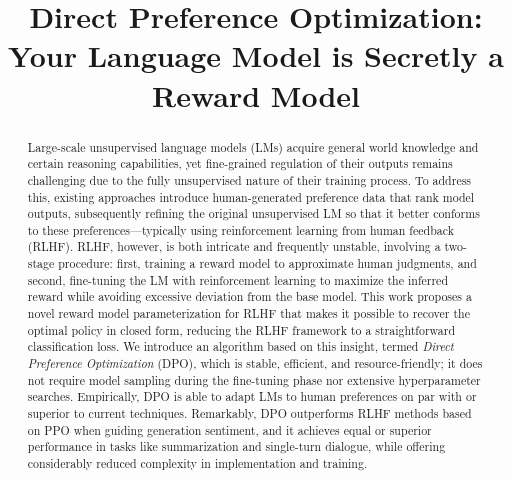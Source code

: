 \title{Direct Preference Optimization: Your Language Model is Secretly a Reward Model}

\begin{abstract}
Large-scale unsupervised language models (LMs) acquire general world knowledge and certain reasoning capabilities, yet fine-grained regulation of their outputs remains challenging due to the fully unsupervised nature of their training process. To address this, existing approaches introduce human-generated preference data that rank model outputs, subsequently refining the original unsupervised LM so that it better conforms to these preferences—typically using reinforcement learning from human feedback (RLHF). RLHF, however, is both intricate and frequently unstable, involving a two-stage procedure: first, training a reward model to approximate human judgments, and second, fine-tuning the LM with reinforcement learning to maximize the inferred reward while avoiding excessive deviation from the base model. This work proposes a novel reward model parameterization for RLHF that makes it possible to recover the optimal policy in closed form, reducing the RLHF framework to a straightforward classification loss. We introduce an algorithm based on this insight, termed \textit{Direct Preference Optimization} (DPO), which is stable, efficient, and resource-friendly; it does not require model sampling during the fine-tuning phase nor extensive hyperparameter searches. Empirically, DPO is able to adapt LMs to human preferences on par with or superior to current techniques. Remarkably, DPO outperforms RLHF methods based on PPO when guiding generation sentiment, and it achieves equal or superior performance in tasks like summarization and single-turn dialogue, while offering considerably reduced complexity in implementation and training.
\end{abstract}

